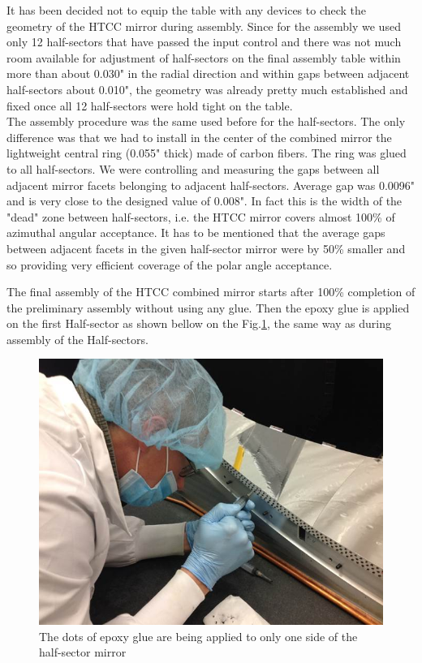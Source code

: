 \indent It has been decided not to equip the table with any devices to check the geometry of the HTCC mirror during assembly. Since for the assembly we used only 12 half-sectors that have passed the input control and there was not much room available for adjustment of half-sectors on the final assembly table within more than about 0.030" in the radial direction and within gaps between adjacent half-sectors about 0.010", the geometry was already pretty much established and fixed once all 12 half-sectors were hold tight on the table.
\\
\indent The assembly procedure was the same used before for the half-sectors. The only difference was that we had to install in the center of the combined mirror the lightweight central ring (0.055" thick) made of carbon fibers. The ring was glued to all half-sectors. We were controlling and measuring the gaps between all adjacent mirror facets belonging to adjacent half-sectors. Average gap was 0.0096" and is very close to the designed value of 0.008". In fact this is the width of the "dead" zone between half-sectors, i.e. the HTCC mirror covers almost 100\% of azimuthal angular acceptance. It has to be mentioned that the average gaps between adjacent facets in the given half-sector mirror were by 50\% smaller and so providing very efficient coverage of the polar angle acceptance. 

The final assembly of the HTCC combined mirror starts after 100\% completion of the preliminary assembly without using any glue. Then the epoxy glue is applied on the first Half-sector as shown bellow on the Fig.\ref{fig:Ap_Gl_Half_Sect}, the same way as during assembly of the Half-sectors.
 
\begin{figure}[ht]
    \centering
    \includegraphics[width=1.0\linewidth]{images/Ap_Gl_Half_Sect.jpg}
    \caption{The dots of epoxy glue are being applied to only one side of the half-sector mirror}
    \label{fig:Ap_Gl_Half_Sect}
\end{figure}
 
